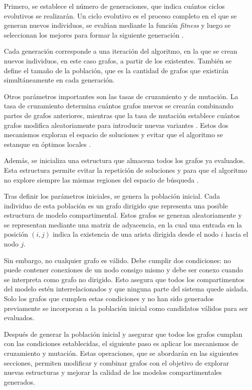 Primero, se establece el número de generaciones, que indica cuántos ciclos evolutivos se realizarán. Un ciclo evolutivo es el proceso completo en el que se 
generan nuevos individuos, se evalúan mediante la función \textit{fitness} y luego se seleccionan los mejores para formar la siguiente generación \cite{Goldberg1989}. 

Cada generación corresponde a una iteración del algoritmo, en la que se crean nuevos individuos, en este caso grafos, a partir de los existentes. También se define 
el tamaño de la población, que es la cantidad de grafos que existirán simultáneamente en cada generación.

Otros parámetros importantes son las tasas de cruzamiento y de mutación. La tasa de cruzamiento determina cuántos grafos nuevos se crearán combinando partes de 
grafos anteriores, mientras que la tasa de mutación establece cuántos grafos modifica aleatoriamente para introducir nuevas variantes \cite{Holland1992, Goldberg1989}. 
Estos dos mecanismos exploran el espacio de soluciones y evitar que el algoritmo se estanque en óptimos locales \cite{Holland1992, Goldberg1989}. 

Además, se inicializa una estructura que almacena todos los grafos ya evaluados. Esta estructura permite evitar la repetición de soluciones y para que el algoritmo no 
explore siempre las mismas regiones del espacio de búsqueda \cite{Eiben2015}.

Tras definir los parámetros iniciales, se genera la población inicial. Cada individuo de esta población es un grafo dirigido que representa una posible 
estructura de modelo compartimental. Estos grafos se generan aleatoriamente y se representan mediante una matriz de adyacencia, en la cual una entrada en la 
posición $(i, j)$ indica la existencia de una arista dirigida desde el nodo $i$ hacia el nodo $j$.

Sin embargo, no cualquier grafo es válido. Debe cumplir dos condiciones: no puede contener conexiones de un nodo consigo mismo y debe ser conexo cuando se interpreta 
como grafo no dirigido. Esto asegura que todos los compartimentos del modelo estén interrelacionados y que ninguna parte del sistema quede aislada. Solo los grafos 
que cumplen estas condiciones y no han sido generados previamente se incorporan a la población inicial como candidatos válidos para ser evaluados.

Después de generar la población inicial y asegurar que todos los grafos cumplan con las condiciones establecidas, el siguiente paso es aplicar los mecanismos de 
cruzamiento y mutación. Estas operaciones, que se abordarán en las siguientes secciones, permiten modificar y combinar grafos con el objetivo de explorar nuevas 
estructuras y mejorar la calidad de los modelos compartimentales generados.

